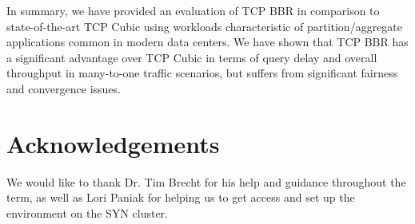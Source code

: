 \documentclass[letterpaper,twocolumn,10pt]{article}
\begin{document}
In summary, we have provided an evaluation of TCP BBR in comparison to state-of-the-art TCP Cubic using workloads characteristic of partition/aggregate applications common in modern data centers. We have shown that TCP BBR has a significant advantage over TCP Cubic in terms of query delay and overall throughput in many-to-one traffic scenarios, but suffers from significant fairness and convergence issues.

\section{Acknowledgements}

We would like to thank Dr. Tim Brecht for his help and guidance throughout the term, as well as Lori Paniak for helping us to get access and set up the environment on the SYN cluster.

{\footnotesize 
}
\end{document}
